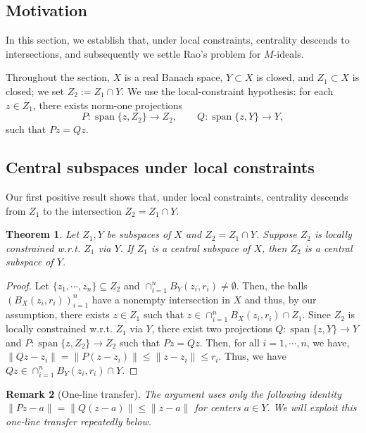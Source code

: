 \documentclass[11pt]{amsart}
\newtheorem{thm}{Theorem}[section]
\newtheorem{rem}[thm]{Remark}
\newcommand{\ra}{\rightarrow}
\newcommand{\es}{\emptyset}
\newcommand{\ci}{\subseteq}
\DeclareMathOperator{\spn}{span}
\begin{document}
\subsection{Motivation}

In this section, we establish that, under local constraints, 
centrality descends to intersections, and subsequently we settle Rao’s problem for $M$-ideals.

Throughout the section, 
$X$ is a real Banach space, $Y\subset X$ is closed, and
$Z_1\subset X$ is closed; we set $Z_2:=Z_1\cap Y$.
We use the local-constraint hypothesis: for each $z\in Z_1$, there exists
norm-one projections
\[
P:\spn\{z,Z_2\}\to Z_2,\qquad
Q:\spn\{z,Y\}\to Y,
\]
such that $Pz=Qz$.


\subsection{Central subspaces under local constraints}
Our first positive result shows that, under local constraints, 
centrality descends from $Z_1$ to the intersection $Z_2=Z_1\cap Y$.

\begin{thm}\label{T7}
Let $Z_1,Y$ be subspaces of $X$ and $Z_2=Z_1\cap Y$. Suppose $Z_2$ is locally constrained w.r.t. $Z_1$ via $Y$. If $Z_1$ is a central subspace of $X$, then $Z_2$ is a central subspace of $Y$.
\end{thm}
\begin{proof}
Let  $\{z_1,\cdots,z_n\}\ci Z_2$ and $\cap_{i=1}^nB_Y(z_i,r_i)\neq\es$. Then, the balls $(B_X(z_i,r_i))_{i=1}^n$ have a nonempty intersection in $X$ and thus, by our assumption, there exists $z\in Z_1$ such that $z\in\cap_{i=1}^nB_X(z_i,r_i)\cap Z_1$. Since $Z_2$ is locally constrained w.r.t. $Z_1$ via $Y$, there exist two projections $Q:\spn\{z,Y\}\ra Y$ and $P:\spn\{z,Z_2\}\ra Z_2$ such that $Pz=Qz$. Then, for all $i=1,\cdots,n$, we have, $\|Qz-z_i\|=\|P(z-z_i)\|\leq\|z-z_i\|
\leq r_i$. Thus, we have $Qz\in\cap_{i=1}^nB_Y(z_i,r_i)\cap Y$.
\end{proof}



\begin{rem}[One-line transfer]
The argument uses only the following identity
$\|Pz-a\|=\|Q(z-a)\|\le \|z-a\|$ for centers $a\in Y$.
We will exploit this one-line transfer repeatedly below.
\end{rem}
\end{document}

